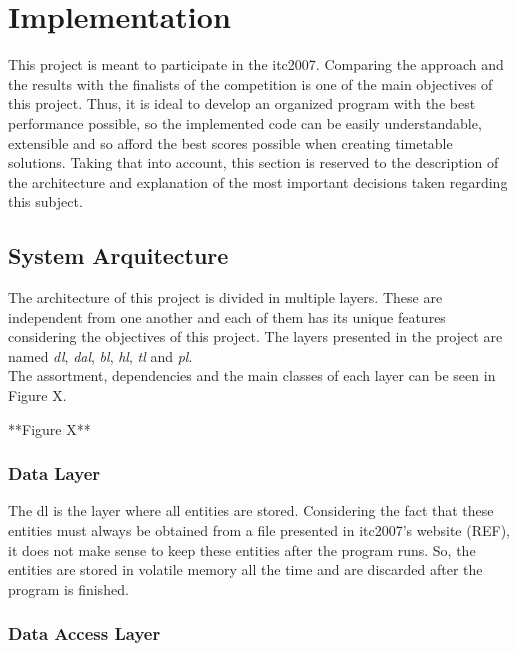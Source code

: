 \chapter{Implementation}
\label{implementation}
\thispagestyle{plain}

This project is meant to participate in the \gls{itc2007}. Comparing the approach and the results with the finalists of the competition is one of the main objectives of this project. Thus, it is ideal to develop an organized program with the best performance possible, so the implemented code can be easily understandable, extensible and so afford the best scores possible when creating timetable solutions. Taking that into account, this section is reserved to the description of the architecture and explanation of the most important decisions taken regarding this subject.

\section{System Arquitecture}

The architecture of this project is divided in multiple layers. These are independent from one another and each of them has its unique features considering the objectives of this project. The layers presented in the project are named \textit{\gls{dl}}, \textit{\gls{dal}}, \textit{\gls{bl}}, \textit{\gls{hl}}, \textit{\gls{tl}} and \textit{\gls{pl}}. \\

The assortment, dependencies and the main classes of each layer can be seen in {\color{red}Figure X}.

{\color{red}**Figure X**}

\subsection{Data Layer}

The \gls{dl} is the layer where all entities are stored. Considering the fact that these entities must always be obtained from a file presented in \gls{itc2007}'s website {\color{red}(REF)}, it does not make sense to keep these entities after the program runs. So, the entities are stored in volatile memory all the time and are discarded after the program is finished.

\subsection{Data Access Layer}

